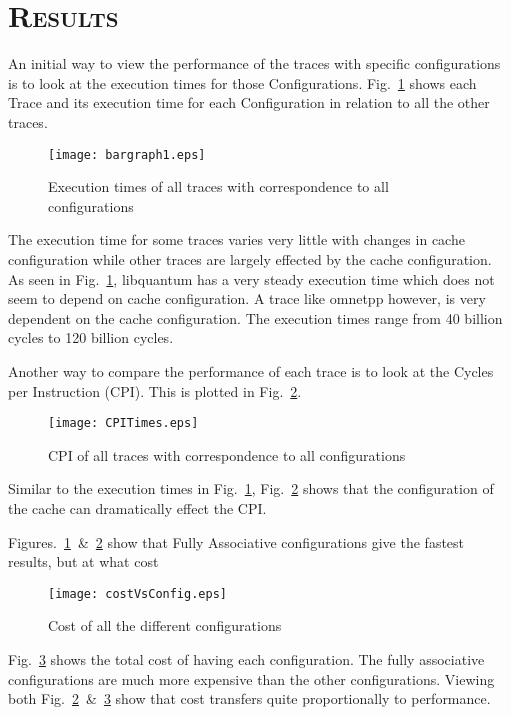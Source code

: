 \documentclass[FinalReport.tex]{subfiles}
\begin{document}
\section*{\textsc{\Large Results}}

An initial way to view the performance of the traces with specific configurations is to look at the execution times for those Configurations.  Fig.~\ref{fig:executiontimes} shows each Trace and its execution time for each Configuration in relation to all the other traces.
\begin{figure}[H]
\centering
\texttt{[image: bargraph1.eps]}
\caption{Execution times of all traces with correspondence to all configurations\label{fig:executiontimes}}
\end{figure}
The execution time for some traces varies very little with changes in cache configuration while other traces are largely effected by the cache configuration.  As seen in Fig.~\ref{fig:executiontimes}, {libquantum} has a very steady execution time which does not seem to depend on cache configuration.  A trace like {omnetpp} however, is very dependent on the cache configuration.  The execution times range from 40 billion cycles to 120 billion cycles. 

Another way to compare the performance of each trace is to look at the Cycles per Instruction (CPI).  This is plotted in Fig.~\ref{fig:CPI}.
\begin{figure}[H]
\centering
\texttt{[image: CPITimes.eps]}
\caption{CPI of all traces with correspondence to all configurations\label{fig:CPI}}
\end{figure}

Similar to the execution times in Fig.~\ref{fig:executiontimes}, Fig.~\ref{fig:CPI} shows that the configuration of the cache can dramatically effect the CPI. 

Figures.~\ref{fig:executiontimes}~\&~\ref{fig:CPI} show that Fully Associative configurations give the fastest results, but at what cost
\begin{figure}[H]
\centering
\texttt{[image: costVsConfig.eps]}
\caption{Cost of all the different configurations\label{fig:costVsConfig}}
\end{figure}
Fig.~\ref{fig:costVsConfig} shows the total cost of having each configuration.  The fully associative configurations are much more expensive than the other configurations.  Viewing both Fig.~\ref{fig:CPI}~\&~\ref{fig:costVsConfig} show that cost transfers quite proportionally to performance.  





\end{document}
